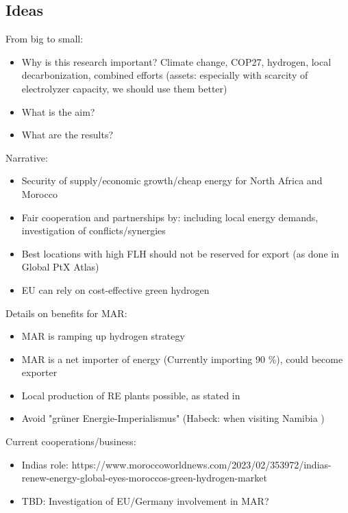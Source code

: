 
\subsection{Ideas}
From big to small:
\begin{itemize}
    \item Why is this research important? Climate change, COP27, hydrogen, local decarbonization, combined efforts (assets: especially with scarcity of electrolyzer capacity, we should use them better)
    \item What is the aim?
    \item What are the results?
\end{itemize}
Narrative: 
\begin{itemize}
    \item Security of supply/economic growth/cheap energy for North Africa and Morocco
    \item Fair cooperation and partnerships by: including local energy demands, investigation of conflicts/synergies
    \item Best locations with high FLH should not be reserved for export (as done in Global PtX Atlas)
    \item EU can rely on cost-effective green hydrogen
\end{itemize}

Details on benefits for MAR:
\begin{itemize}
    \item MAR is ramping up hydrogen strategy
    \item MAR is a net importer of energy (Currently importing 90 \%), could become exporter
    \item Local production of RE plants possible, as stated in \cite{Ersoy2022}
    \item Avoid "gr{\"u}ner Energie-Imperialismus" (Habeck: when visiting Namibia ) \cite{HabeckEnergieimperialismus}
\end{itemize}

Current cooperations/business:
\begin{itemize}
    \item Indias role: https://www.moroccoworldnews.com/2023/02/353972/indias-renew-energy-global-eyes-moroccos-green-hydrogen-market
    \item TBD: Investigation of EU/Germany involvement in MAR?
\end{itemize}


